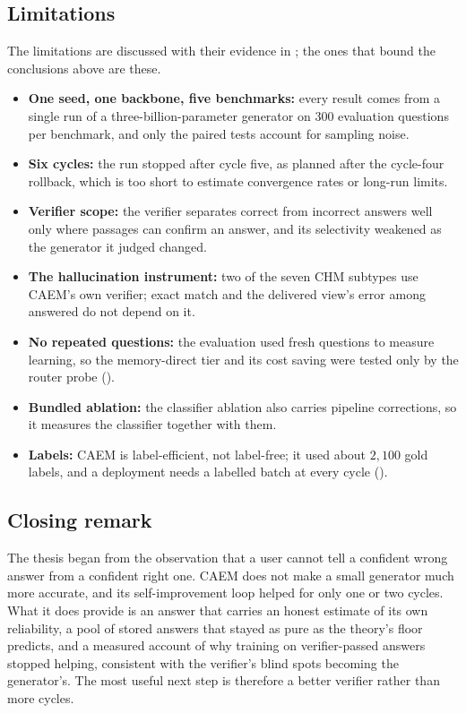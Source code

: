 \subsection{Limitations}
\label{sec:concl-open}

The limitations are discussed with their evidence in ; the ones that bound the conclusions above are these.
\begin{itemize}
    \item \textbf{One seed, one backbone, five benchmarks:} every result comes from a single run of a three-billion-parameter generator on $300$ evaluation questions per benchmark, and only the paired tests account for sampling noise.
    \item \textbf{Six cycles:} the run stopped after cycle five, as planned after the cycle-four rollback, which is too short to estimate convergence rates or long-run limits.
    \item \textbf{Verifier scope:} the verifier separates correct from incorrect answers well only where passages can confirm an answer, and its selectivity weakened as the generator it judged changed.
    \item \textbf{The hallucination instrument:} two of the seven CHM subtypes use CAEM's own verifier; exact match and the delivered view's error among answered do not depend on it.
    \item \textbf{No repeated questions:} the evaluation used fresh questions to measure learning, so the memory-direct tier and its cost saving were tested only by the router probe ().
    \item \textbf{Bundled ablation:} the classifier ablation also carries pipeline corrections, so it measures the classifier together with them.
    \item \textbf{Labels:} CAEM is label-efficient, not label-free; it used about $2{,}100$ gold labels, and a deployment needs a labelled batch at every cycle ().
\end{itemize}

\subsection{Closing remark}
\label{sec:concl-closing}

The thesis began from the observation that a user cannot tell a confident wrong answer from a confident right one. CAEM does not make a small generator much more accurate, and its self-improvement loop helped for only one or two cycles. What it does provide is an answer that carries an honest estimate of its own reliability, a pool of stored answers that stayed as pure as the theory's floor predicts, and a measured account of why training on verifier-passed answers stopped helping, consistent with the verifier's blind spots becoming the generator's. The most useful next step is therefore a better verifier rather than more cycles.

